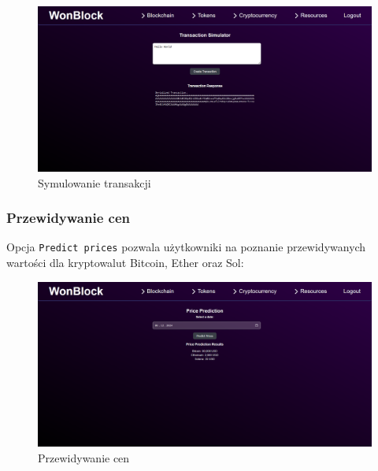 \begin{figure}[htb]
    \centering
    \includegraphics[width=0.8\linewidth]{./instrukcja/SimulateTransaction.png}
    \caption{Symulowanie transakcji}
    \label{fig:Symulowanie transakcji}
\end{figure}

\subsubsection{Przewidywanie cen}
Opcja \texttt{Predict prices} pozwala użytkowniki na poznanie przewidywanych wartości dla kryptowalut Bitcoin, Ether oraz Sol:
\begin{figure}[htb]
    \centering
    \includegraphics[width=0.8\linewidth]{./instrukcja/PredictPrices.png}
    \caption{Przewidywanie cen}
    \label{fig:Przewidywanie cen}
\end{figure}